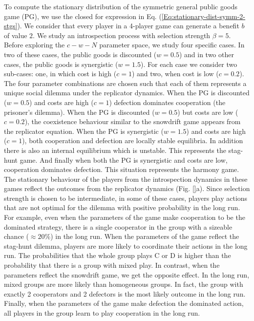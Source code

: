 \documentclass[11pt]{article}
\theoremstyle{plainCl1}
\theoremstyle{plainCl2}
\newcommand{\C}{\mathrm{C}}
\newcommand{\D}{\mathrm{D}}
\begin{document}
\noindent To compute the stationary distribution of the symmetric general public goods game (PG), we use the closed for expression in Eq. (\ref{Eq:stationary-dist-symm-2-stgs}). We consider that every player in a 4-player game can generate a benefit $b$ of value $2$. We study an introspection process with selection strength $\beta = 5$. Before exploring the $c-w-N$ parameter space, we study four specific cases.  In two of these cases, the public goods is discounted ($w = 0.5$) and in two other cases, the public goods is synergistic ($w = 1.5$). For each case we consider two sub-cases: one, in which cost is high ($c = 1$) and two, when cost is low ($c = 0.2$). The four parameter combinations are chosen such that each of them represents a unique social dilemma under the replicator dynamics.  When the PG is discounted ($w = 0.5$) and costs are high ($c = 1$) defection dominates cooperation (the prisoner's dilemma). When the PG is discounted ($w = 0.5$) but costs are low ($c = 0.2$), the coexistence behaviour similar to the snowdrift game appears from the replicator equation. When the PG is synergistic ($w = 1.5$) and costs are high ($c = 1$), both cooperation and defection are locally stable equilibria. In addition there is also an internal equilibrium which is unstable. This represents the stag-hunt game. And finally when both the PG is synergistic and costs are low, cooperation dominates defection. This situation represents the harmony game. The stationary behaviour of the players from the introspection dynamics in these games reflect the outcomes from the replicator dynamics (Fig. \ref{}a). Since selection strength is chosen to be intermediate, in some of these cases, players play actions that are not optimal for the dilemma with positive probability in the long run. For example, even when the parameters of the game make cooperation to be the dominated strategy, there is a single cooperator in the group with a sizeable chance ($\approx 20\%$) in the long run. When the parameters of the game reflect the stag-hunt dilemma, players are more likely to coordinate their actions in the long run. The probabilities that the whole group plays $\C$ or $\D$ is higher than the probability that there is a group with mixed play. In contrast, when the parameters reflect the snowdrift game, we get the opposite effect. In the long run, mixed groups are more likely than homogeneous groups. In fact, the group with exactly 2 cooperators and 2 defectors is the most likely outcome in the long run. Finally, when the parameters of the game make defection the dominated action, all players in the group learn to play cooperation in the long run. \\ \\ 
\end{document}
